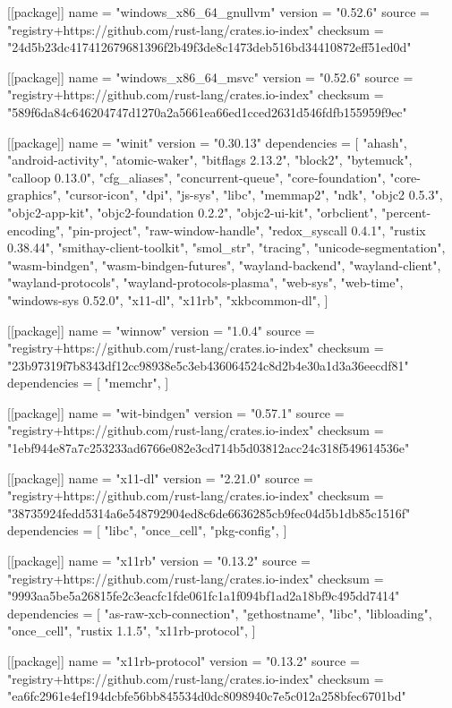 [[package]]
name = "windows_x86_64_gnullvm"
version = "0.52.6"
source = "registry+https://github.com/rust-lang/crates.io-index"
checksum = "24d5b23dc417412679681396f2b49f3de8c1473deb516bd34410872eff51ed0d"

[[package]]
name = "windows_x86_64_msvc"
version = "0.52.6"
source = "registry+https://github.com/rust-lang/crates.io-index"
checksum = "589f6da84c646204747d1270a2a5661ea66ed1cced2631d546fdfb155959f9ec"

[[package]]
name = "winit"
version = "0.30.13"
dependencies = [
 "ahash",
 "android-activity",
 "atomic-waker",
 "bitflags 2.13.2",
 "block2",
 "bytemuck",
 "calloop 0.13.0",
 "cfg_aliases",
 "concurrent-queue",
 "core-foundation",
 "core-graphics",
 "cursor-icon",
 "dpi",
 "js-sys",
 "libc",
 "memmap2",
 "ndk",
 "objc2 0.5.3",
 "objc2-app-kit",
 "objc2-foundation 0.2.2",
 "objc2-ui-kit",
 "orbclient",
 "percent-encoding",
 "pin-project",
 "raw-window-handle",
 "redox_syscall 0.4.1",
 "rustix 0.38.44",
 "smithay-client-toolkit",
 "smol_str",
 "tracing",
 "unicode-segmentation",
 "wasm-bindgen",
 "wasm-bindgen-futures",
 "wayland-backend",
 "wayland-client",
 "wayland-protocols",
 "wayland-protocols-plasma",
 "web-sys",
 "web-time",
 "windows-sys 0.52.0",
 "x11-dl",
 "x11rb",
 "xkbcommon-dl",
]

[[package]]
name = "winnow"
version = "1.0.4"
source = "registry+https://github.com/rust-lang/crates.io-index"
checksum = "23b97319f7b8343df12cc98938e5c3eb436064524c8d2b4e30a1d3a36eecdf81"
dependencies = [
 "memchr",
]

[[package]]
name = "wit-bindgen"
version = "0.57.1"
source = "registry+https://github.com/rust-lang/crates.io-index"
checksum = "1ebf944e87a7c253233ad6766e082e3cd714b5d03812acc24c318f549614536e"

[[package]]
name = "x11-dl"
version = "2.21.0"
source = "registry+https://github.com/rust-lang/crates.io-index"
checksum = "38735924fedd5314a6e548792904ed8c6de6636285cb9fec04d5b1db85c1516f"
dependencies = [
 "libc",
 "once_cell",
 "pkg-config",
]

[[package]]
name = "x11rb"
version = "0.13.2"
source = "registry+https://github.com/rust-lang/crates.io-index"
checksum = "9993aa5be5a26815fe2c3eacfc1fde061fc1a1f094bf1ad2a18bf9c495dd7414"
dependencies = [
 "as-raw-xcb-connection",
 "gethostname",
 "libc",
 "libloading",
 "once_cell",
 "rustix 1.1.5",
 "x11rb-protocol",
]

[[package]]
name = "x11rb-protocol"
version = "0.13.2"
source = "registry+https://github.com/rust-lang/crates.io-index"
checksum = "ea6fc2961e4ef194dcbfe56bb845534d0dc8098940c7e5c012a258bfec6701bd"

